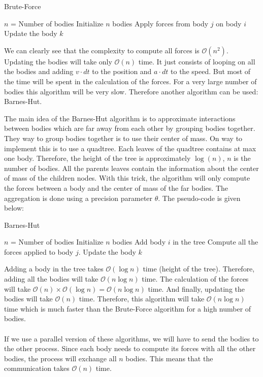 \documentclass[10pt,a4paper]{article}
\begin{document}
\begin{algorithm}
\caption{Brute-Force}\label{bf}
\begin{algorithmic}[1]
\State $n$ = Number of bodies
\State Initialize $n$ bodies
\State Apply forces from body $j$ on body $i$
\EndFor
\EndFor
{}
\State Update the body $k$
\EndFor
\EndWhile
\end{algorithmic}
\end{algorithm}

We can clearly see that the complexity to compute all forces is $\mathcal{O}(n^2)$. Updating the bodies will take only $\mathcal{O}(n)$ time. It just consists of looping on all the bodies and adding $v\cdot dt$ to the position and $a\cdot dt$ to the speed. But most of the time will be spent in the calculation of the forces. For a very large number of bodies this algorithm will be very slow. Therefore another algorithm can be used: Barnes-Hut\cite{bh}.

The main idea of the Barnes-Hut algorithm is to approximate interactions between bodies which are far away from each other by grouping bodies together. They way to group bodies together is to use their center of mass. On way to implement this is to use a quadtree. Each leaves of the quadtree contains at max one body. Therefore, the height of the tree is approximately $\log(n)$,  $n$ is the number of bodies. All the parents leaves contain the information about the center of mass of the children nodes. With this trick, the algorithm will only compute the forces between a body and the center of mass of the far bodies. The aggregation is done using a precision parameter $\theta$.  The pseudo-code is given below:
\begin{algorithm}
\caption{Barnes-Hut}\label{bh}
\begin{algorithmic}[1]
\State $n$ = Number of bodies
\State Initialize $n$ bodies
\State	Add body $i$ in the tree
\EndFor
{} 
\State	Compute all the forces applied to body $j$.
\EndFor	
{}
\State Update the body $k$
\EndFor
\EndWhile
\end{algorithmic}
\end{algorithm}

Adding a body in the tree takes $\mathcal{O}(\log n)$ time (height of the tree). Therefore, adding all the bodies will take $\mathcal{O}(n\log n)$ time. The calculation of the forces will take $\mathcal{O}(n) \times \mathcal{O}(\log n) = \mathcal{O}(n\log n)$ time. And finally, updating the bodies will take $\mathcal{O}(n)$ time. Therefore, this algorithm will take $\mathcal{O}(n\log n)$ time which is much faster than the Brute-Force algorithm for a high number of bodies.
\\\\
If we use a parallel version of these algorithms, we will have to send the bodies to the other process. Since each body needs to compute its forces with all the other bodies, the process will exchange all $n$ bodies. This means that the communication takes $\mathcal{O}(n)$ time.
\end{document}
